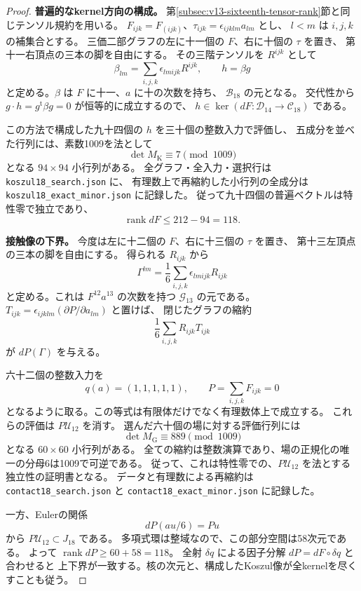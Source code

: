 \begin{proof}
\textbf{普遍的なkernel方向の構成。}
第\ref{subsec:v13-sixteenth-tensor-rank}節と同じテンソル規約を用いる。
$F_{ijk}=F_{(ijk)}$、$\tau_{ijk}=\epsilon_{ijklm}a_{lm}$ とし、
$l<m$ は $i,j,k$ の補集合とする。
三価二部グラフの左に十一個の $F$、右に十個の $\tau$ を置き、
第十一右頂点の三本の脚を自由にする。
その三階テンソルを $R^{ijk}$ として
\[
 \beta_{lm}=\sum_{i,j,k}\epsilon_{lmijk}R^{ijk},\qquad h=\beta g
\]
と定める。$\beta$ は $F$ に十一、$a$ に十の次数を持ち、
$\mathcal B_{18}$ の元となる。
交代性から $g\cdot h=g^{\mathrm t}\beta g=0$ が恒等的に成立するので、
$h\in\ker(dF:\mathcal D_{14}\to\mathcal C_{18})$ である。

この方法で構成した九十四個の $h$ を三十個の整数入力で評価し、
五成分を並べた行列には、素数1009を法として
\[
                 \det M_{\mathrm K}\equiv7\pmod{1009}
\]
となる $94\times94$ 小行列がある。
全グラフ・全入力・選択行は
\texttt{koszul18\_search.json} に、
有理数上で再縮約した小行列の全成分は
\texttt{koszul18\_exact\_minor.json} に記録した。
従って九十四個の普遍ベクトルは特性零で独立であり、
\[
                         \operatorname{rank}dF\le212-94=118.
\]

\textbf{接触像の下界。}
今度は左に十二個の $F$、右に十三個の $\tau$ を置き、
第十三左頂点の三本の脚を自由にする。
得られる $R_{ijk}$ から
\[
              \Gamma^{lm}=\frac16\sum_{i,j,k}\epsilon_{lmijk}R_{ijk}
\]
と定める。これは $F^{12}a^{13}$ の次数を持つ
$\mathcal G_{13}$ の元である。
$T_{ijk}=\epsilon_{ijklm}(\partial P/\partial a_{lm})$ と置けば、
閉じたグラフの縮約
\[
                         \frac16\sum_{i,j,k}R_{ijk}T_{ijk}
\]
が $dP(\Gamma)$ を与える。

六十二個の整数入力を
\[
 q(a)=(1,1,1,1,1),\qquad
 P=\sum_{i,j,k}F_{ijk}=0
\]
となるように取る。この等式は有限体だけでなく有理数体上で成立する。
これらの評価は $P\mathcal U_{12}$ を消す。
選んだ六十個の場に対する評価行列には
\[
                    \det M_{\mathrm G}\equiv889\pmod{1009}
\]
となる $60\times60$ 小行列がある。
全ての縮約は整数演算であり、場の正規化の唯一の分母6は1009で可逆である。
従って、これは特性零での、$P\mathcal U_{12}$ を法とする独立性の証明書となる。
データと有理数による再縮約は
\texttt{contact18\_search.json} と
\texttt{contact18\_exact\_minor.json} に記録した。

一方、Eulerの関係
\[
                         dP(au/6)=Pu
\]
から $P\mathcal U_{12}\subset J_{18}$ である。
多項式環は整域なので、この部分空間は58次元である。
よって $\operatorname{rank}dP\ge60+58=118$。
全射 $\delta q$ による因子分解 $dP=dF\circ\delta q$ と合わせると
上下界が一致する。核の次元と、構成したKoszul像が全kernelを尽くすことも従う。
\end{proof}

